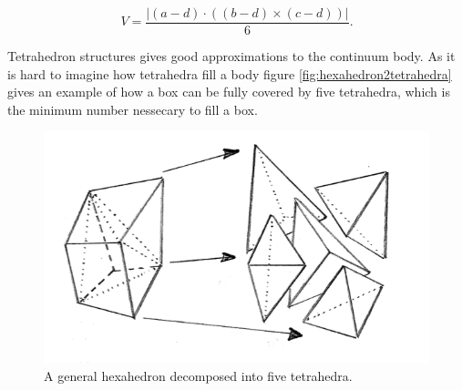 \begin{equation}
    V = \frac {|(a-d) \cdot ((b-d) \times (c-d))|}{6}. 
\end{equation}





Tetrahedron structures gives good approximations to the continuum
body. As it is hard to imagine how tetrahedra fill a body
figure \vref{fig:hexahedron2tetrahedra} gives an example of how a
box can be fully covered by five tetrahedra, which is the minimum
number nessecary to fill a box.

\begin{figure}
  \centering
  \includegraphics[width=12cm]{./images/finite_element_method_hexahedron2tetrahedra.png}
\caption{A general hexahedron decomposed into five tetrahedra.}
\label{fig:hexahedron2tetrahedra}
\end{figure}

